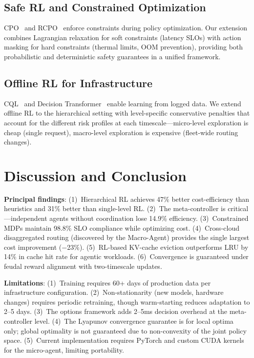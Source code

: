 \documentclass[conference,10pt]{IEEEtran}
\begin{document}
\subsection{Safe RL and Constrained Optimization}

CPO~\cite{achiam2017cpo} and RCPO~\cite{tessler2018rcpo} enforce constraints during policy optimization. Our extension combines Lagrangian relaxation for soft constraints (latency SLOs) with action masking for hard constraints (thermal limits, OOM prevention), providing both probabilistic and deterministic safety guarantees in a unified framework.

\subsection{Offline RL for Infrastructure}

CQL~\cite{kumar2020conservative} and Decision Transformer~\cite{chen2021decision} enable learning from logged data. We extend offline RL to the hierarchical setting with level-specific conservative penalties that account for the different risk profiles at each timescale---micro-level exploration is cheap (single request), macro-level exploration is expensive (fleet-wide routing changes).

\section{Discussion and Conclusion}
\label{sec:disc}

\textbf{Principal findings}: (1)~Hierarchical RL achieves 47\% better cost-efficiency than heuristics and 31\% better than single-level RL. (2)~The meta-controller is critical---independent agents without coordination lose 14.9\% efficiency. (3)~Constrained MDPs maintain 98.8\% SLO compliance while optimizing cost. (4)~Cross-cloud disaggregated routing (discovered by the Macro-Agent) provides the single largest cost improvement ($-$23\%). (5)~RL-based KV-cache eviction outperforms LRU by 14\% in cache hit rate for agentic workloads. (6)~Convergence is guaranteed under feudal reward alignment with two-timescale updates.

\textbf{Limitations}: (1)~Training requires 60+ days of production data per infrastructure configuration. (2)~Non-stationarity (new models, hardware changes) requires periodic retraining, though warm-starting reduces adaptation to 2--5 days. (3)~The options framework adds 2--5ms decision overhead at the meta-controller level. (4)~The Lyapunov convergence guarantee is for local optima only; global optimality is not guaranteed due to non-convexity of the joint policy space. (5)~Current implementation requires PyTorch and custom CUDA kernels for the micro-agent, limiting portability.
\end{document}
